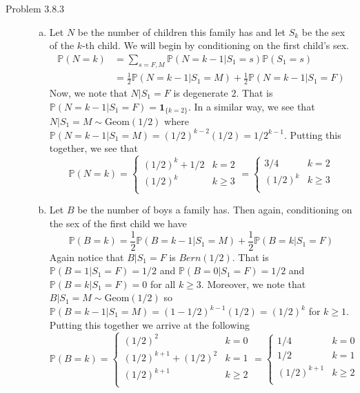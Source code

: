 \documentclass[12pt]{article}  %
\newcommand{\prob}{{\mathbb{P}}}
\newcommand{\ind}{{\mathbf{1}}}
\begin{document}
\begin{description}
\item[Problem 3.8.3]
\begin{enumerate}[(a)]
\item Let $N$ be the number of children this family has and let $S_k$ be the sex of the $k$-th child. We will begin by conditioning on the first child's sex. 
\begin{align*}
\prob(N = k) &= \sum_{s = F,M}\prob(N = k-1|S_1 = s)\prob(S_1 = s)\\ &= \frac{1}{2}\prob(N = k-1|S_1 = M) + \frac{1}{2}\prob(N =k-1|S_1 = F) 
\end{align*}
Now, we note that $N|S_1 = F$ is degenerate $2$. That is $\prob(N = k-1|S_1 = F) = \ind_{\{k = 2\}}$. In a similar way, we see that $N|S_1 = M\sim \text{Geom}(1/2)$ where $\prob(N = k-1|S_1 = M) = (1/2)^{k-2}(1/2) = 1/2^{k-1}$. Putting this together, we see that 
\[
\prob(N  =k) = \begin{cases}
(1/2)^{k} + 1/2 & k = 2\\
(1/2)^{k} & k\geq 3\\
\end{cases} = \begin{cases}
3/4 & k = 2\\
(1/2)^{k} & k\geq 3\\
\end{cases}
\]
\item Let $B$ be the number of boys a family has. Then again, conditioning on the sex of the first child we have $$\prob(B = k) = \frac{1}{2}\prob(B = k -1|S_1 = M) + \frac{1}{2}\prob(B = k|S_1 = F)$$ Again notice that $B|S_1 = F$ is $Bern(1/2)$. That is $\prob(B = 1|S_1 = F) = 1/2$ and $\prob(B = 0|S_1 = F) = 1/2$ and $\prob(B = k|S_1 = F) = 0$ for all $k\geq 3$. Moreover, we note that $B|S_1 = M \sim\text{Geom}(1/2)$ so $\prob(B = k -1|S_1 = M) = (1-1/2)^{k-1}(1/2) = (1/2)^k$ for $k\geq 1$. Putting this together we arrive at the following 
\[
\prob(B  =k) = \begin{cases}
(1/2)^2 & k = 0\\
(1/2)^{k+1} + (1/2)^2 & k = 1\\
(1/2)^{k+1} & k\geq 2\\
\end{cases} = \begin{cases}
1/4 & k = 0\\
1/2 & k = 1\\
(1/2)^{k+1} & k\geq 2\\
\end{cases} 
\]
\end{enumerate}


\end{description}
\end{document}
